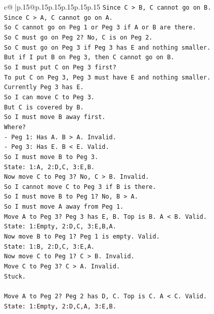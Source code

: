 \documentclass{article}
\begin{document}
{\begin{supertabular}{c@{$\;$}|p{.15\linewidth}@{}p{.15\linewidth}p{.15\linewidth}p{.15\linewidth}p{.15\linewidth}p{.15\linewidth}}
{{{\texttt{Since C > B, C cannot go on B.} \\
\texttt{Since C > A, C cannot go on A.} \\
\texttt{So C cannot go on Peg 1 or Peg 3 if A or B are there.} \\
\texttt{So C must go on Peg 2? No, C is on Peg 2.} \\
\texttt{So C must go on Peg 3 if Peg 3 has E and nothing smaller.} \\
\texttt{But if I put B on Peg 3, then C cannot go on B.} \\
\texttt{So I must put C on Peg 3 first?} \\
\texttt{To put C on Peg 3, Peg 3 must have E and nothing smaller.} \\
\texttt{Currently Peg 3 has E.} \\
\texttt{So I can move C to Peg 3.} \\
\texttt{But C is covered by B.} \\
\texttt{So I must move B away first.} \\
\texttt{Where?} \\
\texttt{{-} Peg 1: Has A. B > A. Invalid.} \\
\texttt{{-} Peg 3: Has E. B < E. Valid.} \\
\texttt{So I must move B to Peg 3.} \\
\texttt{State: 1:A, 2:D,C, 3:E,B.} \\
\texttt{Now move C to Peg 3? No, C > B. Invalid.} \\
\texttt{So I cannot move C to Peg 3 if B is there.} \\
\texttt{So I must move B to Peg 1? No, B > A.} \\
\texttt{So I must move A away from Peg 1.} \\
\texttt{Move A to Peg 3? Peg 3 has E, B. Top is B. A < B. Valid.} \\
\texttt{State: 1:Empty, 2:D,C, 3:E,B,A.} \\
\texttt{Now move B to Peg 1? Peg 1 is empty. Valid.} \\
\texttt{State: 1:B, 2:D,C, 3:E,A.} \\
\texttt{Now move C to Peg 1? C > B. Invalid.} \\
\texttt{Move C to Peg 3? C > A. Invalid.} \\
\texttt{Stuck.} \\
\\ 
\texttt{Move A to Peg 2? Peg 2 has D, C. Top is C. A < C. Valid.} \\
\texttt{State: 1:Empty, 2:D,C,A, 3:E,B.} \\
}}}
\end{supertabular}}
\end{document}
